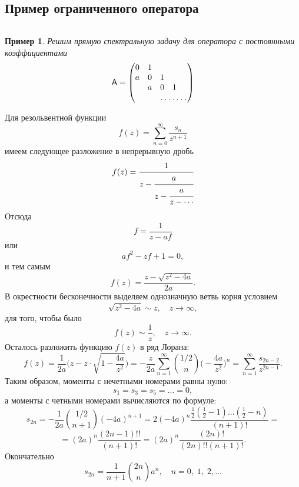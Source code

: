 \documentclass[12 pt, a4 paper]{article}
\theoremstyle{plain}   \newtheorem{Pro}{Задача}
\newtheorem{Exa}{Пример}
\begin{document}
\subsection{Пример ограниченного оператора}
$ \; $
\\
\begin{Exa}
Решим прямую спектральную задачу для оператора с постоянными
коэффициентами
\begin{equation*}
  \mathsf{A}=
    \begin{pmatrix}
	  0 & 1 & \; & \; & \; \\
	  a & 0 & 1 & \; & \; \\
	  \; & a & 0 & 1 & \; \\
	  \; & \; & \hdotsfor{3}
	\end{pmatrix}
\end{equation*}
\end{Exa}
Для резольвентной функции
\begin{equation*}
  f(z)= \sum _{n=0}^{\infty}
  \frac{s_n}{z^{n+1}}
\end{equation*}
имеем следующее разложение в непрерывную дробь
\begin{equation*}
  f(z)=
    \cfrac{1}{z-
	 \cfrac{a}{z-
	  \cfrac{a}{z- \dotsb
	   }}}
\end{equation*}
Отсюда
$$
  f=\frac{1}{z-af}
$$
или
$$
  af^2 -zf+1=0,
$$
и тем самым
$$
  f(z)=\frac{z-\sqrt{z^2 -4a}}{2a}.
$$
В окрестности бесконечности выделяем однозначную ветвь
корня условием
$$
  \sqrt{z^2 -4a} \sim z, \quad z \rightarrow \infty ,
$$
для того, чтобы было
$$
  f(z) \sim \frac{1}{z}, \quad z \rightarrow \infty .
$$
Осталось разложить функцию
$ f(z) $
в ряд Лорана:
\begin{equation*}
  f(z)=\frac{1}{2a} \Biggl ( z-
  z \cdot \sqrt{1- \frac{4a}{z^2}} \Biggr ) =
  -\frac{z}{2a} \sum _{n=1}^{\infty}
  \binom{1/2}{n}\biggl (-\frac{4a}{z^2} \biggr ) ^n =
  \sum _{n=1}^{\infty} \frac{s_{2n-2}}{z^{2n-1}}.
\end{equation*}
Таким образом, моменты с нечетными номерами равны нулю:
$$
  s_1 =s_3 =s_5 =...=0,
$$
а моменты с четными номерами вычисляются по формуле:
$$
  s_{2n}=-\frac{1}{2a} \binom{1/2}{n+1}(-4a)^{n+1}=
  2(-4a)^n \frac{\frac{1}{2}(\frac{1}{2}-1)...(\frac{1}{2}-n)}
  {(n+1)!}=
$$
$$
  = (2a)^n \frac{(2n-1)!!}{(n+1)!}=
  (2a)^n \frac{(2n)!}{(2n)!!(n+1)!}.
$$
Окончательно
$$
  s_{2n}=\frac{1}{n+1} \binom{2n}{n} a^n ,
  \quad n=0, \; 1, \; 2,...
$$
\\
\end{document}
